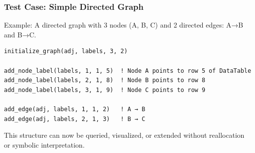 \documentclass{article}
\begin{document}
\subsubsection{Test Case: Simple Directed Graph}

Example: A directed graph with 3 nodes (A, B, C) and 2 directed edges: A→B and B→C.

\begin{verbatim}
initialize_graph(adj, labels, 3, 2)

add_node_label(labels, 1, 1, 5)  ! Node A points to row 5 of DataTable
add_node_label(labels, 2, 1, 8)  ! Node B points to row 8
add_node_label(labels, 3, 1, 9)  ! Node C points to row 9

add_edge(adj, labels, 1, 1, 2)   ! A → B
add_edge(adj, labels, 2, 1, 3)   ! B → C
\end{verbatim}

This structure can now be queried, visualized, or extended without reallocation or symbolic interpretation.
\end{document}
